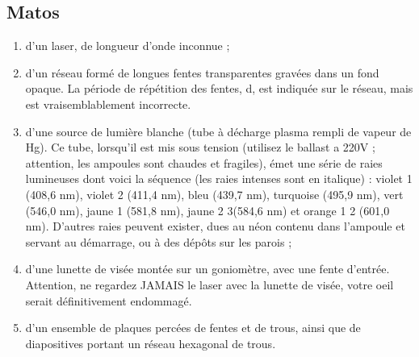 \documentclass[a4paper,11pt]{article}
\begin{document}
\subsection{Matos}
\begin{enumerate}
\item d’un laser, de longueur d’onde inconnue ;
\item d’un réseau formé de longues fentes transparentes gravées dans un fond opaque. La période de répétition des fentes, d, est indiquée sur le réseau, mais est vraisemblablement incorrecte.
\item d’une source de lumière blanche (tube à décharge plasma rempli de vapeur de Hg). Ce tube, lorsqu’il est mis sous tension (utilisez le ballast a 220V ; attention, les ampoules sont chaudes et fragiles),  émet une série de raies lumineuses dont voici la séquence (les raies intenses sont en italique) : violet 1 (408,6 nm), violet 2 (411,4 nm), bleu (439,7 nm), turquoise (495,9 nm), vert (546,0 nm), jaune 1 (581,8 nm), jaune 2 3(584,6 nm) et orange 1 2 (601,0 nm). D’autres raies peuvent exister, dues au néon contenu dans l’ampoule et servant au démarrage, ou à des dépôts sur les parois ; \label{matos}
\item d’une lunette de visée montée sur un goniomètre, avec une fente d’entrée. Attention, ne regardez JAMAIS le laser avec la lunette de visée, votre oeil serait définitivement endommagé.
\item d’un ensemble de plaques percées de fentes et de trous, ainsi que de diapositives portant un réseau hexagonal de trous.

\end{enumerate}
\end{document}

